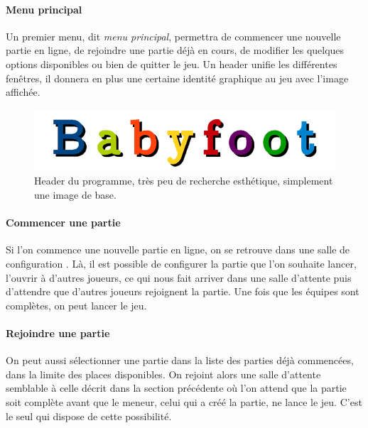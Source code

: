 \documentclass[a4paper,12pt]{report}
\begin{document}
\paragraph{Menu principal}
Un premier menu, dit \emph{menu principal}, permettra de commencer une nouvelle partie en ligne, de rejoindre une partie
déjà en cours, de modifier les quelques options disponibles ou bien de quitter le jeu. Un header unifie les différentes fenêtres, il donnera en plus une certaine identité graphique au jeu avec l'image affichée.
    
    \begin{figure}[H]
	\begin{center}
	\includegraphics[width=17cm]{pictures/header.png} 
	\end{center}
	\caption{Header du programme, très peu de recherche esthétique, simplement une image de base.}
    \end{figure}
\paragraph{Commencer une partie}
Si l'on commence une nouvelle partie en ligne, on se retrouve dans une \og salle de configuration \fg. Là, il est possible de configurer la partie que l'on souhaite lancer, l'ouvrir à d'autres joueurs, ce qui nous fait arriver dans une \og salle d'attente \fg puis d'attendre que d'autres joueurs rejoignent la partie. Une fois que les équipes sont complètes, on peut lancer le jeu.
\paragraph{Rejoindre une partie}
On peut aussi sélectionner une partie dans la liste des parties déjà commencées, dans la limite des places disponibles. On rejoint alors une \og salle d'attente \fg semblable à celle décrit dans la section précédente où l'on attend que la partie soit complète avant que le meneur, celui qui a créé la partie, ne lance le jeu. C'est le seul qui dispose de cette possibilité.
\end{document}
